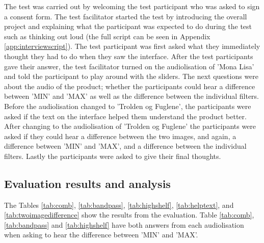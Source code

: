 The test was carried out by welcoming the test participant who was asked to sign a consent form. The test facilitator started the test by introducing the overall project and explaining what the participant was expected to do during the test such as thinking out loud (the full script can be seen in Appendix \ref{app:interviewscript}). The test participant was first asked what they immediately thought they had to do when they saw the interface. After the test participants gave their answer, the test facilitator turned on the audiolisation of 'Mona Lisa' and told the participant to play around with the sliders. The next questions were about the audio of the product; whether the participants could hear a difference between 'MIN' and 'MAX' as well as the difference between the individual filters. Before the audiolisation changed to 'Trolden og Fuglene', the participants were asked if the text on the interface helped them understand the product better. After changing to the audiolisation of 'Trolden og Fuglene' the participants were asked if they could hear a difference between the two images, and again, a difference between 'MIN' and 'MAX', and a difference between the individual filters. Lastly the participants were asked to give their final thoughts.

\subsection{Evaluation results and analysis}
The Tables \ref{tab:comb}, \ref{tab:bandpass}, \ref{tab:highshelf}, \ref{tab:helptext}, and \ref{tab:twoimagedifference} show the results from the evaluation. Table \ref{tab:comb}, \ref{tab:bandpass} and \ref{tab:highshelf} have both answers from each audiolisation when asking to hear the difference between 'MIN' and 'MAX'. 

